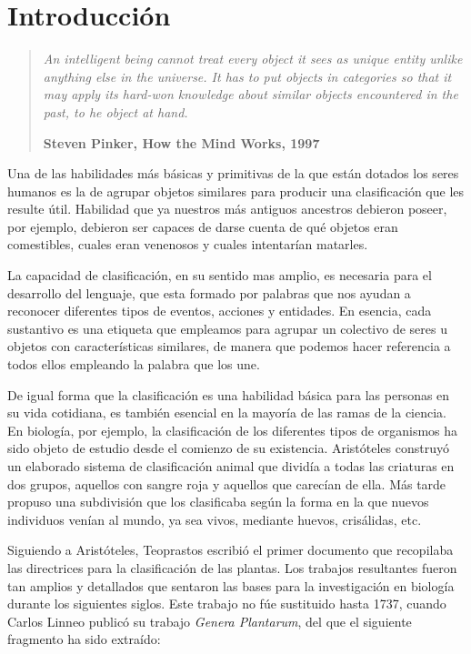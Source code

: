
\chapter{Introducción}\label{ch:introduccion}

\begin{quotation}{\slshape
		An intelligent being cannot treat every object it sees as unique entity unlike anything else in the universe. It has to put objects in categories so that it may apply its hard-won knowledge about similar objects encountered in the past, to he object at hand.}
		\begin{flushright}
			\textbf{Steven Pinker, How the Mind Works, 1997} 
		\end{flushright}
\end{quotation}

Una de las habilidades más básicas y primitivas de la que están dotados los seres humanos es la de agrupar objetos similares para producir una clasificación que les resulte útil. Habilidad que ya nuestros más antiguos ancestros debieron poseer, por ejemplo, debieron ser capaces de darse cuenta de qué objetos eran comestibles, cuales eran venenosos y cuales intentarían matarles.

La capacidad de clasificación, en su sentido mas amplio, es necesaria para el desarrollo del lenguaje, que esta formado por palabras que nos ayudan a reconocer diferentes tipos de eventos, acciones y entidades. En esencia, cada sustantivo es una etiqueta que empleamos para agrupar un colectivo de seres u objetos con características similares, de manera que podemos hacer referencia a todos ellos empleando la palabra que los une.

De igual forma que la clasificación es una habilidad básica para las personas en su vida cotidiana, es también esencial en la mayoría de las ramas de la ciencia. En biología, por ejemplo, la clasificación de los diferentes tipos de organismos ha sido objeto de estudio desde el comienzo de su existencia. Aristóteles construyó un elaborado sistema de clasificación animal que dividía a todas las criaturas en dos grupos, aquellos con sangre roja y aquellos que carecían de ella. Más tarde propuso una subdivisión que los clasificaba según la forma en la que nuevos individuos venían al mundo, ya sea vivos, mediante huevos, crisálidas, etc.

Siguiendo a Aristóteles, Teoprastos escribió el primer documento que recopilaba las directrices para la clasificación de las plantas. Los trabajos resultantes fueron tan amplios y detallados que sentaron las bases para la investigación en biología durante los siguientes siglos. Este trabajo no fúe sustituido hasta 1737, cuando Carlos Linneo publicó su trabajo \textit{Genera Plantarum}, del que el siguiente fragmento ha sido extraído:

